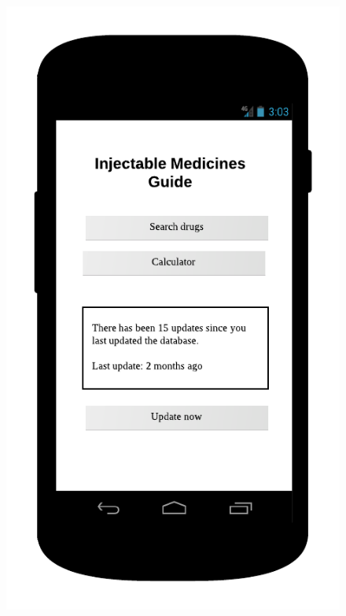 \begin{description}
\begin{figure}
\centering
\begin{minipage}{.5\textwidth}
  \centering
  \includegraphics[width=.7\linewidth]{Images/mockups/main.png}
\end{minipage}
\begin{minipage}{.5\textwidth}
  \centering

\end{minipage}
\end{figure}
\end{description}

